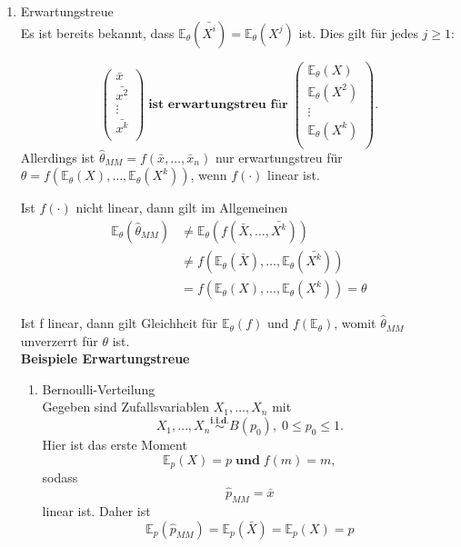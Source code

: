 \documentclass[10pt]{article}
\newcommand{\FZV}{X_1, \ldots, X_n} %
\newcommand{\EW}{\mathbb{E}} %
\begin{document}
\begin{enumerate}
	\item Erwartungstreue\\
	Es ist bereits bekannt, dass $\EW_\theta(\bar{X^i})=\EW_\theta(X^j)$ ist. Dies gilt für jedes $j \geq 1$:
	
	\begin{equation*}
		\left(
		\begin{array}{c}
			\bar{x}\\
			\bar{x^2}\\
			\vdots\\
			\bar{x^k}\\
		\end{array}
		\right)\; \textbf{ist erwartungstreu für} \;
		\left(
		\begin{array}{c}
		 \EW_\theta(X)\\
		 \EW_\theta(X^2)\\
			\vdots\\
		 \EW_\theta(X^k) \\
		\end{array}
		\right).
	\end{equation*}
	 Allerdings ist $\hat{\theta}_{MM} = f(\bar{x}, \ldots, \bar{x}_n)$ nur erwartungstreu für $\theta = f(\EW_\theta(X), \ldots, \EW_\theta(X^k))$, wenn $f(\cdot)$ linear ist. 
	 
	 Ist $f(\cdot)$ nicht linear, dann gilt im Allgemeinen
	 \begin{equation*}
	 	\begin{split}
	 	\EW_\theta(\hat{\theta}_{MM}) &\neq \EW_\theta(f(\bar{X}, \ldots, \bar{X^k}))\\
	 	&\neq f(\EW_\theta(\bar{X}),\ldots, \EW_\theta(\bar{X^k}))\\
	 	&= f(\EW_\theta({X}),\ldots, \EW_\theta({X^k})) =  \theta
	 \end{split}
	 \end{equation*}
	
	Ist f linear, dann gilt Gleichheit für $\EW_{\theta}(f)$ und $f(\EW_{\theta})$, womit $\hat{\theta}_{MM}$ unverzerrt für $\theta$ ist.\\
	
	\textbf{Beispiele Erwartungstreue}

	\begin{enumerate}[label = (\roman*)]
		\item Bernoulli-Verteilung\\
			Gegeben sind Zufallsvariablen $\FZV$ mit
		\begin{equation*}
			\FZV \overset{\textbf{i.i.d.}}{\sim} B(p_0), \; 0 \leq p_0 \leq 1.
		\end{equation*} 
		Hier ist das erste Moment
		\begin{equation*}
			\EW_p(X)=p \; \textbf{und} \; 	f(m)=m,
		\end{equation*}
		sodass
		\begin{equation*}
			\hat{p}_{MM} = \bar{x} 
		\end{equation*}
		linear ist. Daher ist 
		\begin{equation*}
			\EW_p(\hat{p}_{MM}) = \EW_p(\bar{X}) = \EW_p(X) = p
		\end{equation*}
		

\end{enumerate}
\end{enumerate}
\end{document}
